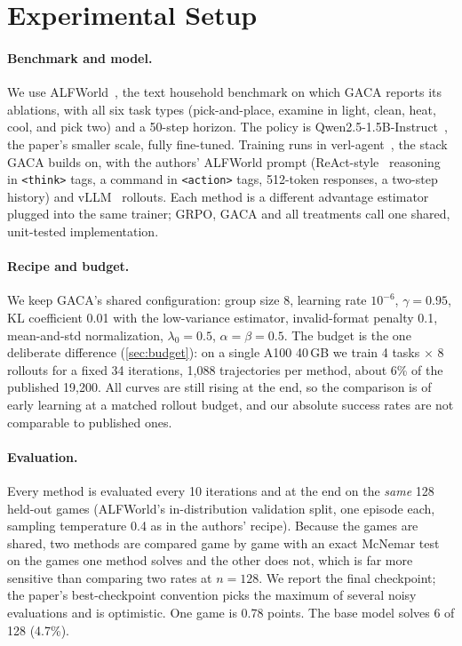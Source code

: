 \section{Experimental Setup}
\label{sec:setup}

\paragraph{Benchmark and model.}
We use ALFWorld~\cite{shridhar2020alfworld}, the text household benchmark on which GACA reports its
ablations, with all six task types (pick-and-place, examine in light, clean, heat, cool, and pick two)
and a 50-step horizon. The policy is Qwen2.5-1.5B-Instruct~\cite{qwen2025qwen25}, the paper's smaller
scale, fully fine-tuned. Training runs in verl-agent~\cite{feng2025gigpo,sheng2025hybridflow}, the
stack GACA builds on, with the authors' ALFWorld prompt (ReAct-style~\cite{yao2022react} reasoning in
\texttt{<think>} tags, a command in \texttt{<action>} tags, 512-token responses, a two-step history) and
vLLM~\cite{kwon2023vllm} rollouts. Each method is a different advantage estimator plugged into the
same trainer; GRPO, GACA and all treatments call one shared, unit-tested implementation.

\paragraph{Recipe and budget.}
We keep GACA's shared configuration: group size 8, learning rate $10^{-6}$, $\gamma = 0.95$, KL
coefficient 0.01 with the low-variance estimator, invalid-format penalty 0.1, mean-and-std
normalization, $\lambda_0 = 0.5$, $\alpha = \beta = 0.5$. The budget is the one deliberate difference
(\cref{sec:budget}): on a single A100 40\,GB we train 4 tasks $\times$ 8 rollouts for a fixed 34
iterations, 1,088 trajectories per method, about 6\% of the published 19,200. All curves are still
rising at the end, so the comparison is of early learning at a matched rollout budget, and our absolute
success rates are not comparable to published ones.

\paragraph{Evaluation.}
Every method is evaluated every 10 iterations and at the end on the \emph{same} 128 held-out games
(ALFWorld's in-distribution validation split, one episode each, sampling temperature 0.4 as in the
authors' recipe). Because the games are shared, two methods are compared game by game with an exact
McNemar test~\cite{mcnemar1947} on the games one method solves and the other does not, which is far
more sensitive than comparing two rates at $n = 128$. We report the final checkpoint; the paper's
best-checkpoint convention picks the maximum of several noisy evaluations and is optimistic. One game
is 0.78 points. The base model solves 6 of 128 (4.7\%).

